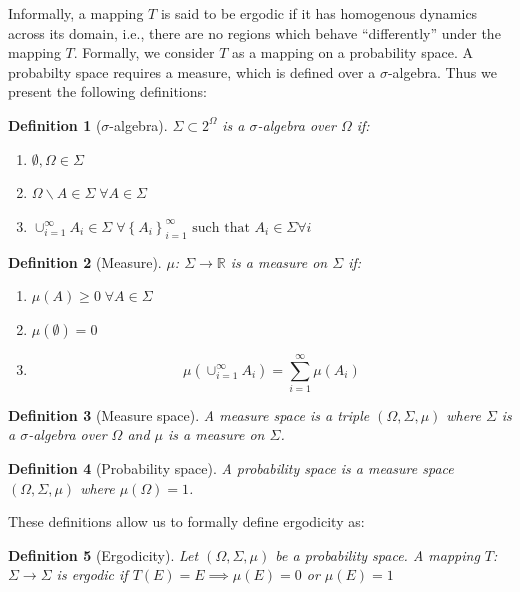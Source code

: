 \documentclass{report}
\begin{document}
Informally, a mapping $T$ is said to be ergodic if it has homogenous dynamics across its domain, i.e., there are no regions which behave ``differently'' under the mapping $T$. Formally, we consider $T$ as a mapping on a probability space. A probabilty space requires a measure, which is defined over a $\sigma$-algebra. Thus we present the following definitions:

\newtheorem{dfn}{Definition}
\begin{dfn}[$\sigma$-algebra]
$\Sigma \subset 2^{\Omega}$ is a \emph{$\sigma$-algebra} over $\Omega$ if:
\begin{enumerate}
\item
$\emptyset, \Omega \in \Sigma$
\item
$\Omega \backslash A \in \Sigma \; \forall A \in \Sigma$
\item
$\cup_{i=1}^{\infty}A_{i} \in \Sigma \; \forall \left\{A_{i}\right\}_{i=1}^{\infty}\text{ such that }A_{i} \in \Sigma \forall i$
\end{enumerate}
\end{dfn}

\begin{dfn}[Measure]
$\mu$: $\Sigma \rightarrow \mathbb{R}$ is a \emph{measure} on $\Sigma$ if:
\begin{enumerate}
\item
$\mu(A) \ge 0 \; \forall A \in \Sigma$
\item
$\mu(\emptyset) = 0$
\item
\[
\mu\left(\cup_{i=1}^{\infty} A_{i} \right) = \sum_{i=1}^{\infty} \mu(A_{i})
\]
\end{enumerate}
\end{dfn}

\begin{dfn}[Measure space]
A \emph{measure space} is a triple $(\Omega, \Sigma, \mu)$ where $\Sigma$ is a $\sigma$-algebra over $\Omega$ and $\mu$ is a measure on $\Sigma$.
\end{dfn}

\begin{dfn}[Probability space]
A \emph{probability space} is a measure space $(\Omega, \Sigma, \mu)$ where $\mu(\Omega) = 1$.
\end{dfn}

These definitions allow us to formally define ergodicity as:

\begin{dfn}[Ergodicity]
Let $(\Omega, \Sigma, \mu)$ be a probability space. A mapping $T$: $\Sigma \rightarrow \Sigma$ is \emph{ergodic} if $T(E) = E \implies \mu(E) = 0$ or $\mu(E) = 1$
\end{dfn}
\end{document}
